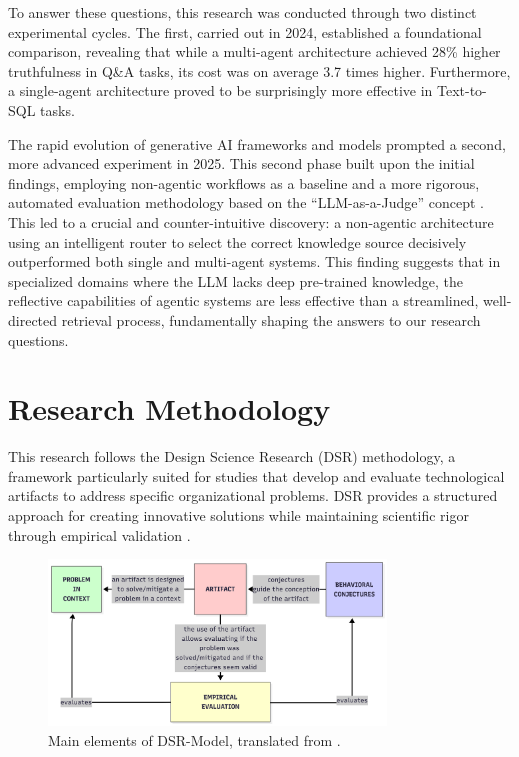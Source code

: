     To answer these questions, this research was conducted through two distinct experimental cycles. The first, carried out in 2024, established a foundational comparison, revealing that while a multi-agent architecture achieved 28\% higher truthfulness in Q\&A tasks, its cost was on average 3.7 times higher. Furthermore, a single-agent architecture proved to be surprisingly more effective in Text-to-SQL tasks.

    The rapid evolution of generative AI frameworks and models prompted a second, more advanced experiment in 2025. This second phase built upon the initial findings, employing non-agentic workflows as a baseline and a more rigorous, automated evaluation methodology based on the ``LLM-as-a-Judge'' concept \citep{Gu2025}. This led to a crucial and counter-intuitive discovery: a non-agentic architecture using an intelligent router to select the correct knowledge source decisively outperformed both single and multi-agent systems. This finding suggests that in specialized domains where the LLM lacks deep pre-trained knowledge, the reflective capabilities of agentic systems are less effective than a streamlined, well-directed retrieval process, fundamentally shaping the answers to our research questions.



\section{Research Methodology}
  
    This research follows the Design Science Research (DSR) methodology, a framework particularly suited for studies that develop and evaluate technological artifacts to address specific organizational problems. DSR provides a structured approach for creating innovative solutions while maintaining scientific rigor through empirical validation \citep{hevner2007three}.
    
    \begin{figure}[h]
        \centering
        \includegraphics[width=0.8\textwidth]{images/dsr-model.png}
        \caption{Main elements of DSR-Model, translated from \citet{Oswald2023}.}
        \label{fig:dsr-model}
    \end{figure}
    
